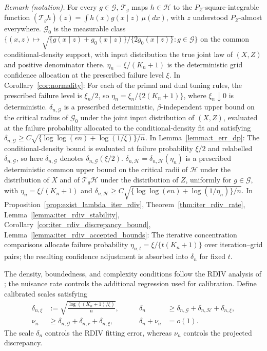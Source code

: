 \documentclass[12pt]{article}
\theoremstyle{plain}
\theoremstyle{definition}
\theoremstyle{remark}
\begin{document}
\noindent\textit{Remark (notation).} For every $g\in\mathcal G$, $\mathcal T_g$ maps $h\in\mathcal H$ to the $P_Z$-square-integrable function $(\mathcal T_g h)(z)=\int h(x)g(x\mid z)\,\mu(dx)$, with $z$ understood $P_Z$-almost everywhere. $\mathcal G_0$ is the measurable class $\{(x,z)\mapsto\sqrt{\{g(x\mid z)+g_0(x\mid z)\}/\{2g_0(x\mid z)\}}:g\in\mathcal G\}$ on the common conditional-density support, with input distribution the true joint law of $(X,Z)$ and positive denominator there. $\eta_n=\xi/(K_n+1)$ is the deterministic grid confidence allocation at the prescribed failure level $\xi$. In Corollary~\ref{cor:normality}: For each of the primal and dual tuning rules, the prescribed failure level is $\xi_n/2$, so $\eta_n=\xi_n/\{2(K_n+1)\}$, where $\xi_n\downarrow0$ is deterministic. $\delta_{n,\mathcal G}$ is a prescribed deterministic, $\beta$-independent upper bound on the critical radius of $\mathcal G_0$ under the joint input distribution of $(X,Z)$, evaluated at the failure probability allocated to the conditional-density fit and satisfying $\delta_{n,\mathcal G}\geqslant C\sqrt{\{\log\log(en)+\log(1/\xi)\}/n}$. In Lemma~\ref{lemma:t_err_dp}: The conditional-density bound is evaluated at failure probability $\xi/2$ and relabelled $\delta_{n,\mathcal G}$, so here $\delta_{n,\mathcal G}$ denotes $\delta_{n,\mathcal G}(\xi/2)$. $\delta_{n,\mathcal H}=\delta_{n,\mathcal H}(\eta_n)$ is a prescribed deterministic common upper bound on the critical radii of $\mathcal H$ under the distribution of $X$ and of $\mathcal T_g\mathcal H$ under the distribution of $Z$, uniformly for $g\in\mathcal G$, with $\eta_n=\xi/(K_n+1)$ and $\delta_{n,\mathcal H}\geqslant C\sqrt{\{\log\log(en)+\log(1/\eta_n)\}/n}$. In Proposition~\ref{prop:exist_lambda_iter_rdiv}, Theorem~\ref{thm:iter_rdiv_rate}, Lemma~\ref{lemma:iter_rdiv_stability}, Corollary~\ref{cor:iter_rdiv_discrepancy_bound}, Lemma~\ref{lemma:iter_rdiv_accepted_bounds}: The iterative concentration comparisons allocate failure probability $\eta_{n,t}=\xi/\{t(K_n+1)\}$ over iteration--grid pairs; the resulting confidence adjustment is absorbed into $\delta_n$ for fixed $t$.


The density, boundedness, and complexity conditions follow the RDIV analysis of \citet{li2024regularized}; the nuisance rate controls the additional regression used for calibration. Define calibrated scales satisfying
\begin{equation}\label{eq:delta_deepiv}
\begin{aligned}
\delta_{n,\xi}&:=\sqrt{\frac{\log((K_n+1)/\xi)}{n}},
&\qquad \delta_n&\geqslant\delta_{n,\mathcal G}+\delta_{n,\mathcal H}+\delta_{n,\xi},\\
\nu_n&\geqslant\delta_{n,\mathcal G}+\delta_{n,r}+\delta_{n,\xi},
&\qquad \delta_n+\nu_n&=o(1).
\end{aligned}
\end{equation}
The scale $\delta_n$ controls the RDIV fitting error, whereas $\nu_n$ controls the projected discrepancy. 
\end{document}
